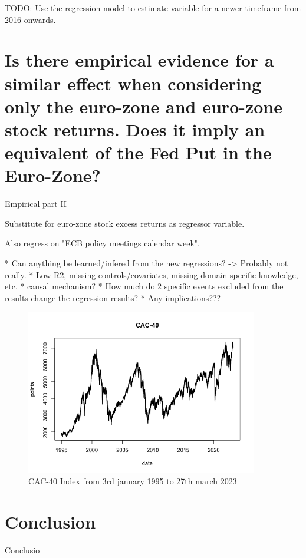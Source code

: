 TODO: Use the regression model to estimate variable for a newer timeframe from 2016 onwards.

\chapter{Is there empirical evidence for a similar effect when considering only the euro-zone and euro-zone stock returns.  Does it imply an equivalent of the Fed Put in the Euro-Zone?}

Empirical part II

Substitute for euro-zone stock excess returns as regressor variable.

Also regress on "ECB policy meetings calendar week". 

* Can anything be learned/infered from the new regressions? -> Probably not really.
* Low R2, missing controls/covariates, missing domain specific knowledge, etc.
* causal mechanism?
* How much do 2 specific events excluded from the results change the regression results?
* Any implications???


\begin{figure}[h]
    \centering
    \includegraphics[width=0.9\textwidth]{figures/cac-40}
    \caption{CAC-40 Index from 3rd january 1995 to 27th march 2023}
\end{figure}

\chapter{Conclusion}

Conclusio


